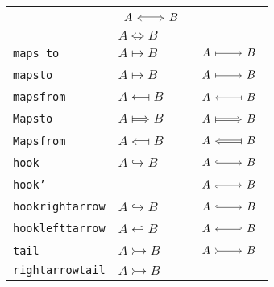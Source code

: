 \documentclass{scrartcl}
\newcommand{\tipname}{\texttt}
\begin{document}
\begin{longtable}{l@{\qquad}l@{\qquad}c}
	&
	$\begin{tikzcd} A \arrow[Leftrightarrow]{r} & B \end{tikzcd}$
	\\
	{}
	&
	$A \iff B$
	&
	{}
	\\
	\midrule
	\tipname{maps to}
	&
	$A \longmapsto B$
	&
	$\begin{tikzcd} A \arrow[maps to]{r} & B \end{tikzcd}$
	\\
	\tipname{mapsto}
	&
	$A \longmapsto B$
	&
	$\begin{tikzcd} A \arrow[mapsto]{r} & B \end{tikzcd}$
	\\
	\tipname{mapsfrom}
	&
	$A \longmapsfrom B$
	&
	$\begin{tikzcd} A \arrow[mapsfrom]{r} & B \end{tikzcd}$
	\\
	\tipname{Mapsto}
	&
	$A \Longmapsto B$
	&
	$\begin{tikzcd} A \arrow[Mapsto]{r} & B \end{tikzcd}$
	\\
	\tipname{Mapsfrom}
	&
	$A \Longmapsfrom B$
	&
	$\begin{tikzcd} A \arrow[Mapsfrom]{r} & B \end{tikzcd}$
	\\
	\midrule
	\tipname{hook}
	&
	$A \hookrightarrow B$
	&
	$\begin{tikzcd} A \arrow[hook]{r} & B \end{tikzcd}$
	\\
	\tipname{hook'}
	&
	{}
	&
	$\begin{tikzcd} A \arrow[hook']{r} & B \end{tikzcd}$
	\\
	\tipname{hookrightarrow}
	&
	$A \hookrightarrow B$
	&
	$\begin{tikzcd} A \arrow[hookrightarrow]{r} & B \end{tikzcd}$
	\\
	\tipname{hooklefttarrow}
	&
	$A \hookleftarrow  B$
	&
	$\begin{tikzcd} A \arrow[hookleftarrow]{r} & B \end{tikzcd}$
	\\
	\midrule
	\tipname{tail}
	&
	$A \rightarrowtail B$
	&
	$\begin{tikzcd} A \arrow[tail]{r} & B \end{tikzcd}$
	\\
	\tipname{rightarrowtail}
	&
	$A \rightarrowtail B$
	&

\end{longtable}
\end{document}
